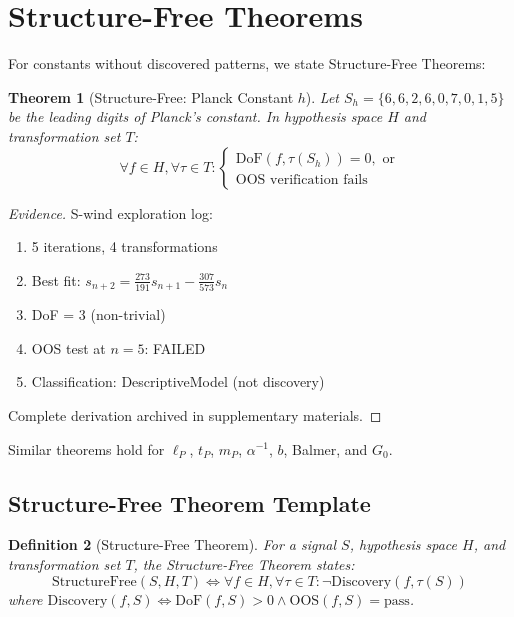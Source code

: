 \documentclass[11pt,a4paper]{article}
\newtheorem{theorem}{Theorem}[section]
\newtheorem{definition}[theorem]{Definition}
\begin{document}
\section{Structure-Free Theorems}
\label{sec:structure-free}

For constants without discovered patterns, we state Structure-Free Theorems:

\begin{theorem}[Structure-Free: Planck Constant $h$]
\label{thm:planck-h}
Let $S_h = \{6, 6, 2, 6, 0, 7, 0, 1, 5\}$ be the leading digits of Planck's constant. In hypothesis space $H$ and transformation set $T$:
\begin{equation}
    \forall f \in H, \forall \tau \in T: \begin{cases}
        \text{DoF}(f, \tau(S_h)) = 0, \text{ or} \\
        \text{OOS verification fails}
    \end{cases}
\end{equation}
\end{theorem}

\begin{proof}[Evidence]
S-wind exploration log:
\begin{enumerate}
    \item 5 iterations, 4 transformations
    \item Best fit: $s_{n+2} = \frac{273}{191}s_{n+1} - \frac{307}{573}s_n$
    \item DoF = 3 (non-trivial)
    \item OOS test at $n=5$: FAILED
    \item Classification: DescriptiveModel (not discovery)
\end{enumerate}
Complete derivation archived in supplementary materials.
\end{proof}

Similar theorems hold for $\ell_P$, $t_P$, $m_P$, $\alpha^{-1}$, $b$, Balmer, and $G_0$.

\subsection{Structure-Free Theorem Template}

\begin{definition}[Structure-Free Theorem]
For a signal $S$, hypothesis space $H$, and transformation set $T$, the Structure-Free Theorem states:
\begin{equation}
    \text{StructureFree}(S, H, T) \iff \forall f \in H, \forall \tau \in T: \neg\text{Discovery}(f, \tau(S))
\end{equation}
where $\text{Discovery}(f, S) \iff \text{DoF}(f, S) > 0 \land \text{OOS}(f, S) = \text{pass}$.
\end{definition}
\end{document}
